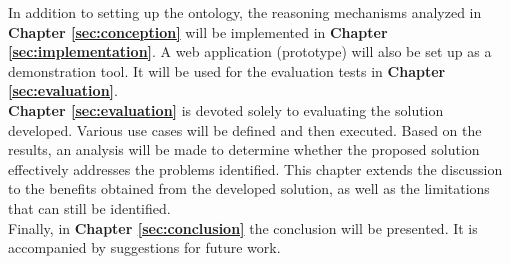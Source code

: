 In addition to setting up the ontology, the reasoning mechanisms analyzed in \textbf{Chapter \ref{sec:conception}} will be implemented in \textbf{Chapter \ref{sec:implementation}}. A web application (prototype) will also be set up as a demonstration tool. It will be used for the evaluation tests in \textbf{Chapter \ref{sec:evaluation}}.\\

\textbf{Chapter \ref{sec:evaluation}} is devoted solely to evaluating the solution developed. Various use cases will be defined and then executed. Based on the results, an analysis will be made to determine whether the proposed solution effectively addresses the problems identified. This chapter extends the discussion to the benefits obtained from the developed solution, as well as the limitations that can still be identified.\\

Finally, in \textbf{Chapter \ref{sec:conclusion}} the conclusion will be presented. It is accompanied by suggestions for future work.


